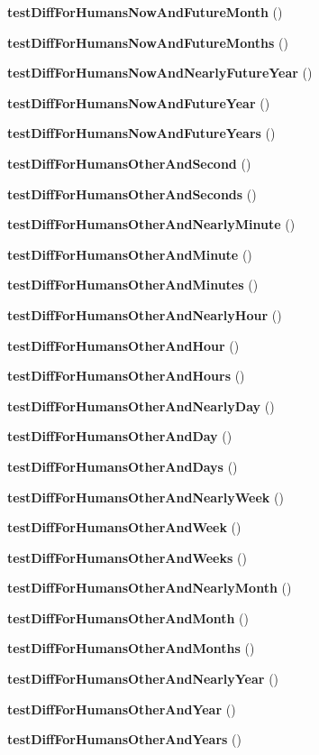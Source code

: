 \begin{DoxyCompactItemize}
\item 
{\bf test\+Diff\+For\+Humans\+Now\+And\+Future\+Month} ()
\item 
{\bf test\+Diff\+For\+Humans\+Now\+And\+Future\+Months} ()
\item 
{\bf test\+Diff\+For\+Humans\+Now\+And\+Nearly\+Future\+Year} ()
\item 
{\bf test\+Diff\+For\+Humans\+Now\+And\+Future\+Year} ()
\item 
{\bf test\+Diff\+For\+Humans\+Now\+And\+Future\+Years} ()
\item 
{\bf test\+Diff\+For\+Humans\+Other\+And\+Second} ()
\item 
{\bf test\+Diff\+For\+Humans\+Other\+And\+Seconds} ()
\item 
{\bf test\+Diff\+For\+Humans\+Other\+And\+Nearly\+Minute} ()
\item 
{\bf test\+Diff\+For\+Humans\+Other\+And\+Minute} ()
\item 
{\bf test\+Diff\+For\+Humans\+Other\+And\+Minutes} ()
\item 
{\bf test\+Diff\+For\+Humans\+Other\+And\+Nearly\+Hour} ()
\item 
{\bf test\+Diff\+For\+Humans\+Other\+And\+Hour} ()
\item 
{\bf test\+Diff\+For\+Humans\+Other\+And\+Hours} ()
\item 
{\bf test\+Diff\+For\+Humans\+Other\+And\+Nearly\+Day} ()
\item 
{\bf test\+Diff\+For\+Humans\+Other\+And\+Day} ()
\item 
{\bf test\+Diff\+For\+Humans\+Other\+And\+Days} ()
\item 
{\bf test\+Diff\+For\+Humans\+Other\+And\+Nearly\+Week} ()
\item 
{\bf test\+Diff\+For\+Humans\+Other\+And\+Week} ()
\item 
{\bf test\+Diff\+For\+Humans\+Other\+And\+Weeks} ()
\item 
{\bf test\+Diff\+For\+Humans\+Other\+And\+Nearly\+Month} ()
\item 
{\bf test\+Diff\+For\+Humans\+Other\+And\+Month} ()
\item 
{\bf test\+Diff\+For\+Humans\+Other\+And\+Months} ()
\item 
{\bf test\+Diff\+For\+Humans\+Other\+And\+Nearly\+Year} ()
\item 
{\bf test\+Diff\+For\+Humans\+Other\+And\+Year} ()
\item 
{\bf test\+Diff\+For\+Humans\+Other\+And\+Years} ()
\item 

\end{DoxyCompactItemize}
